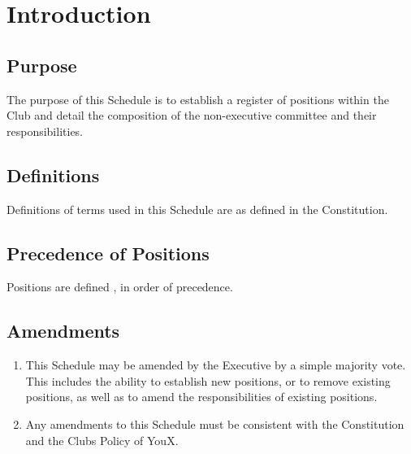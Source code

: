 \documentclass{schedule}
\begin{document}


\tableofcontents
\newpage


\section{Introduction}

\subsection{Purpose}
The purpose of this Schedule is to establish a register of positions within the Club and detail the composition of the non-executive committee and their responsibilities.

\subsection{Definitions}
Definitions of terms used in this Schedule are as defined in the Constitution.

\subsection{Precedence of Positions}
Positions are defined , in order of precedence.

\subsection{Amendments}
\begin{enumerate}[(1)]
    \item This Schedule may be amended by the Executive by a simple majority vote. This includes the ability to establish new positions, or to remove existing positions, as well as to amend the responsibilities of existing positions.
    \item Any amendments to this Schedule must be consistent with the Constitution and the Clubs Policy of YouX.
\end{enumerate}
\end{document}
